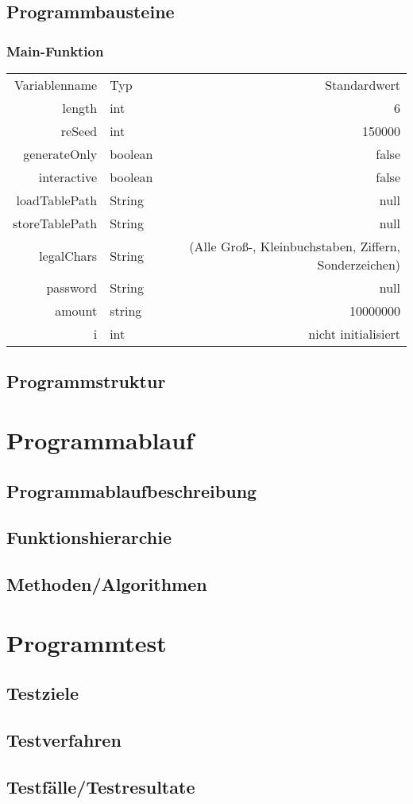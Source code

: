 \documentclass[11pt]{article}
\begin{document}
  \subsection{Programmbausteine}
  \subsubsection{Main-Funktion}
  \begin{tabular}{rlr}
  Variablenname & Typ & Standardwert \\
  length & int & 6 \\
  reSeed & int & 150000 \\
  generateOnly & boolean & false \\
  interactive & boolean & false \\
  loadTablePath & String & null \\
  storeTablePath & String & null \\
  legalChars & String & (Alle Groß-, Kleinbuchstaben, Ziffern, Sonderzeichen)\\
  password & String & null \\
  amount & string & 10000000 \\
  i & int & nicht initialisiert \\
  \end{tabular}
  \subsection{Programmstruktur}
  
  
  \section{Programmablauf}
  \subsection{Programmablaufbeschreibung} 
  \subsection{Funktionshierarchie}
  \subsection{Methoden/Algorithmen}
  
   \section{Programmtest}
  \subsection{Testziele}
  \subsection{Testverfahren}
  \subsection{Testfälle/Testresultate}
   
   
 
\newpage
\end{document}
